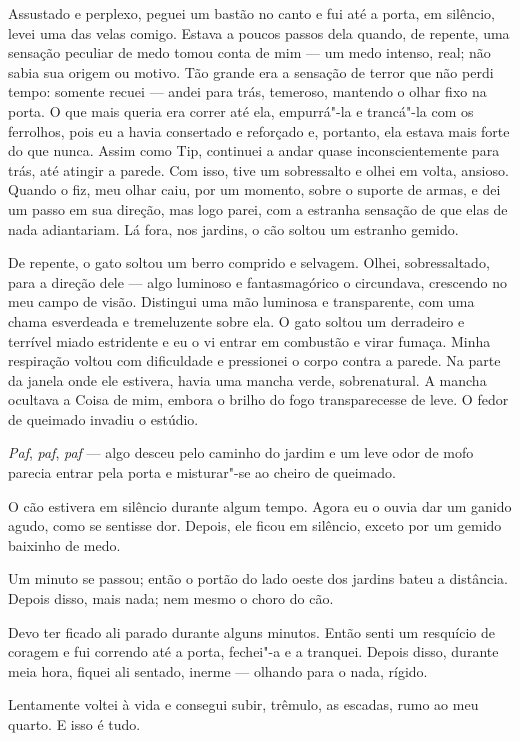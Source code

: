 Assustado e perplexo, peguei um bastão no canto e fui até a porta, em silêncio, levei uma das velas comigo. Estava a
poucos passos dela quando, de repente, uma sensação peculiar de medo tomou conta de mim --- um medo intenso, real; não
sabia sua origem ou motivo. Tão grande era a sensação de terror que não perdi tempo: somente recuei --- andei para
trás, temeroso, mantendo o olhar fixo na porta. O que mais queria era correr até ela, empurrá"-la e trancá"-la com os
ferrolhos, pois eu a havia consertado e reforçado e, portanto, ela estava mais forte do que nunca. Assim como Tip,
continuei a andar quase inconscientemente para trás, até atingir a parede. Com isso, tive um sobressalto e olhei em
volta, ansioso. Quando o fiz, meu olhar caiu, por um momento, sobre o suporte de armas, e dei um passo em sua direção,
mas logo parei, com a estranha sensação de que elas de nada adiantariam. Lá fora, nos jardins, o cão soltou um estranho
gemido.

De repente, o gato soltou um berro comprido e selvagem. Olhei, sobressaltado, para a direção dele --- algo luminoso e
fantasmagórico o circundava, crescendo no meu campo de visão. Distingui uma mão luminosa e transparente, com uma chama
esverdeada e tremeluzente sobre ela. O gato soltou um derradeiro e terrível miado estridente e eu o vi entrar em
combustão e virar fumaça. Minha respiração voltou com dificuldade e pressionei o corpo contra a parede. Na parte da janela
onde ele estivera, havia uma mancha verde, sobrenatural. A mancha ocultava a Coisa de mim, embora o brilho do fogo
transparecesse de leve. O fedor de queimado invadiu o estúdio. 

\textit{Paf}, \textit{paf}, \textit{paf }--- algo desceu pelo caminho do jardim e um leve odor de mofo parecia entrar
pela porta e misturar"-se ao cheiro de queimado.

O cão estivera em silêncio durante algum tempo. Agora eu o ouvia dar um ganido agudo, como se sentisse
dor. Depois, ele ficou em silêncio, exceto por um gemido baixinho de medo.

Um minuto se passou; então o portão do lado oeste dos jardins bateu a distância. Depois disso, mais nada; nem mesmo o
choro do cão.

Devo ter ficado ali parado durante alguns minutos. Então senti um resquício de coragem e fui correndo até a porta,
fechei"-a e a tranquei. Depois disso, durante meia hora, fiquei ali sentado, inerme --- olhando para o nada, rígido.

Lentamente voltei à vida e consegui subir, trêmulo, as escadas, rumo ao meu quarto. E isso é tudo.


